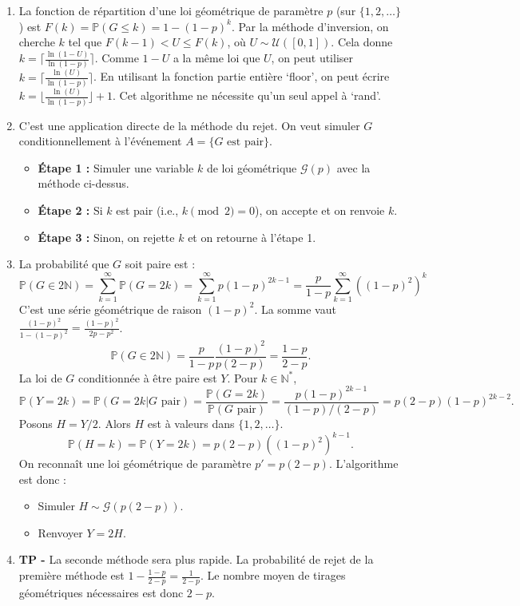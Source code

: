 \documentclass[solutions]{exercices}
\begin{document}
\begin{solution}
\begin{enumerate}
  \item La fonction de répartition d'une loi géométrique de paramètre $p$ (sur $\{1, 2, \dots\}$) est $F(k) = \mathbb{P}(G \le k) = 1 - (1-p)^k$. Par la méthode d'inversion, on cherche $k$ tel que $F(k-1) < U \le F(k)$, où $U \sim \mathcal{U}([0,1])$. Cela donne $k = \lceil \frac{\ln(1-U)}{\ln(1-p)} \rceil$. Comme $1-U$ a la même loi que $U$, on peut utiliser $k = \lceil \frac{\ln(U)}{\ln(1-p)} \rceil$. En utilisant la fonction partie entière `floor', on peut écrire $k = \lfloor \frac{\ln(U)}{\ln(1-p)} \rfloor + 1$. Cet algorithme ne nécessite qu'un seul appel à `rand'.
  \item C'est une application directe de la méthode du rejet. On veut simuler $G$ conditionnellement à l'événement $A = \{G \text{ est pair}\}$.
  \begin{itemize}
      \item \textbf{Étape 1 :} Simuler une variable $k$ de loi géométrique $\mathcal{G}(p)$ avec la méthode ci-dessus.
      \item \textbf{Étape 2 :} Si $k$ est pair (i.e., $k \pmod 2 = 0$), on accepte et on renvoie $k$.
      \item \textbf{Étape 3 :} Sinon, on rejette $k$ et on retourne à l'étape 1.
  \end{itemize}
  \item La probabilité que $G$ soit paire est :
  \[ \mathbb{P}(G \in 2\mathbb{N}) = \sum_{k=1}^{\infty} \mathbb{P}(G=2k) = \sum_{k=1}^{\infty} p(1-p)^{2k-1} = \frac{p}{1-p} \sum_{k=1}^{\infty} ((1-p)^2)^k \]
  C'est une série géométrique de raison $(1-p)^2$. La somme vaut $\frac{(1-p)^2}{1-(1-p)^2} = \frac{(1-p)^2}{2p-p^2}$.
  \[ \mathbb{P}(G \in 2\mathbb{N}) = \frac{p}{1-p} \frac{(1-p)^2}{p(2-p)} = \frac{1-p}{2-p}. \]
  La loi de $G$ conditionnée à être paire est $Y$. Pour $k \in \mathbb{N}^*$,
  \[ \mathbb{P}(Y=2k) = \mathbb{P}(G=2k | G \text{ pair}) = \frac{\mathbb{P}(G=2k)}{\mathbb{P}(G \text{ pair})} = \frac{p(1-p)^{2k-1}}{(1-p)/(2-p)} = p(2-p)(1-p)^{2k-2}. \]
  Posons $H = Y/2$. Alors $H$ est à valeurs dans $\{1,2,\dots\}$.
  \[ \mathbb{P}(H=k) = \mathbb{P}(Y=2k) = p(2-p) \left((1-p)^2\right)^{k-1}. \]
  On reconnaît une loi géométrique de paramètre $p' = p(2-p)$.
  L'algorithme est donc :
  \begin{itemize}
      \item Simuler $H \sim \mathcal{G}(p(2-p))$.
      \item Renvoyer $Y=2H$.
  \end{itemize}
  \item \textbf{TP -} La seconde méthode sera plus rapide. La probabilité de rejet de la première méthode est $1 - \frac{1-p}{2-p} = \frac{1}{2-p}$. Le nombre moyen de tirages géométriques nécessaires est donc $2-p$.
\end{enumerate}
\end{solution}
\end{document}
